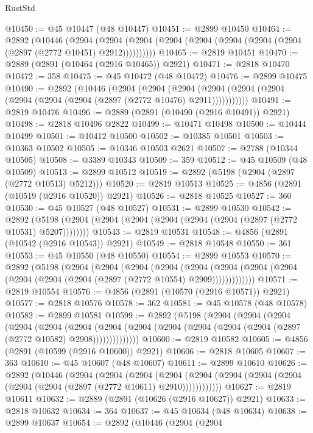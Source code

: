 \begin{lexlean}{RustStd}
\begin{coremodule}
@10450 := @45 @10447 (@48 @10447)
@10451 := @2899 @10450
@10464 := @2892
    (@10446
      (@2904 (@2904 (@2904 (@2904 (@2904 (@2904 (@2904 (@2904 (@2897 (@2772 @10451) @2912))))))))))
@10465 := @2819 @10451
@10470 := @2889 (@2891 (@10464 (@2916 @10465)) @2921)
@10471 := @2818 @10470
@10472 := 358
@10475 := @45 @10472 (@48 @10472)
@10476 := @2899 @10475
@10490 := @2892
    (@10446
      (@2904
        (@2904
          (@2904 (@2904 (@2904 (@2904 (@2904 (@2904 (@2904 (@2897 (@2772 @10476) @2911)))))))))))
@10491 := @2819 @10476
@10496 := @2889 (@2891 (@10490 (@2916 @10491)) @2921)
@10498 := @2818 @10496 @2822
@10499 := @10471 @10498
@10500 := @10444 @10499
@10501 := @10412 @10500
@10502 := @10385 @10501
@10503 := @10363 @10502
@10505 := @10346 @10503 @2621
@10507 := @2788 (@10344 @10505)
@10508 := @3389 @10343
@10509 := 359
@10512 := @45 @10509 (@48 @10509)
@10513 := @2899 @10512
@10519 := @2892 (@5198 (@2904 (@2897 (@2772 @10513) @5212)))
@10520 := @2819 @10513
@10525 := @4856 (@2891 (@10519 (@2916 @10520)) @2921)
@10526 := @2818 @10525
@10527 := 360
@10530 := @45 @10527 (@48 @10527)
@10531 := @2899 @10530
@10542 := @2892 (@5198 (@2904 (@2904 (@2904 (@2904 (@2904 (@2904 (@2897 (@2772 @10531) @5207))))))))
@10543 := @2819 @10531
@10548 := @4856 (@2891 (@10542 (@2916 @10543)) @2921)
@10549 := @2818 @10548
@10550 := 361
@10553 := @45 @10550 (@48 @10550)
@10554 := @2899 @10553
@10570 := @2892
    (@5198
      (@2904
        (@2904
          (@2904
            (@2904
              (@2904
                (@2904 (@2904 (@2904 (@2904 (@2904 (@2904 (@2897 (@2772 @10554) @2909)))))))))))))
@10571 := @2819 @10554
@10576 := @4856 (@2891 (@10570 (@2916 @10571)) @2921)
@10577 := @2818 @10576
@10578 := 362
@10581 := @45 @10578 (@48 @10578)
@10582 := @2899 @10581
@10599 := @2892
    (@5198
      (@2904
        (@2904
          (@2904
            (@2904
              (@2904
                (@2904
                  (@2904
                    (@2904 (@2904 (@2904 (@2904 (@2904 (@2897 (@2772 @10582) @2908))))))))))))))
@10600 := @2819 @10582
@10605 := @4856 (@2891 (@10599 (@2916 @10600)) @2921)
@10606 := @2818 @10605
@10607 := 363
@10610 := @45 @10607 (@48 @10607)
@10611 := @2899 @10610
@10626 := @2892
    (@10446
      (@2904
        (@2904
          (@2904
            (@2904 (@2904 (@2904 (@2904 (@2904 (@2904 (@2904 (@2897 (@2772 @10611) @2910))))))))))))
@10627 := @2819 @10611
@10632 := @2889 (@2891 (@10626 (@2916 @10627)) @2921)
@10633 := @2818 @10632
@10634 := 364
@10637 := @45 @10634 (@48 @10634)
@10638 := @2899 @10637
@10654 := @2892
    (@10446
      (@2904
        (@2904

\end{coremodule}
\end{lexlean}

